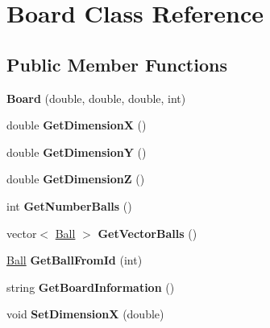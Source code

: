 \hypertarget{classBoard}{\section{Board Class Reference}
\label{classBoard}
}
\subsection*{Public Member Functions}
\begin{DoxyCompactItemize}
\item 
\hypertarget{classBoard_af26e9eedabd3559a0a823594a9836a9c}{{\bfseries Board} (double, double, double, int)}\label{classBoard_af26e9eedabd3559a0a823594a9836a9c}

\item 
\hypertarget{classBoard_a6004dec19aa29da6fffee5ceec0a13ae}{double {\bfseries Get\+Dimension\+X} ()}\label{classBoard_a6004dec19aa29da6fffee5ceec0a13ae}

\item 
\hypertarget{classBoard_a5d90ba60a138223ce0dc9679d50fbdb8}{double {\bfseries Get\+Dimension\+Y} ()}\label{classBoard_a5d90ba60a138223ce0dc9679d50fbdb8}

\item 
\hypertarget{classBoard_aff29d5fed09c4f613fd8f910e77125ff}{double {\bfseries Get\+Dimension\+Z} ()}\label{classBoard_aff29d5fed09c4f613fd8f910e77125ff}

\item 
\hypertarget{classBoard_a626fb9f489b8bdf89d08c6b49b3e7555}{int {\bfseries Get\+Number\+Balls} ()}\label{classBoard_a626fb9f489b8bdf89d08c6b49b3e7555}

\item 
\hypertarget{classBoard_a3b6346e52d69e15ddba100248cfe4789}{vector$<$ \hyperlink{classBall}{Ball} $>$ {\bfseries Get\+Vector\+Balls} ()}\label{classBoard_a3b6346e52d69e15ddba100248cfe4789}

\item 
\hypertarget{classBoard_ad7661f151aa307b5cf3c4a7aa809ced4}{\hyperlink{classBall}{Ball} {\bfseries Get\+Ball\+From\+Id} (int)}\label{classBoard_ad7661f151aa307b5cf3c4a7aa809ced4}

\item 
\hypertarget{classBoard_a4963e139df9b877cdd57770e01d26d7a}{string {\bfseries Get\+Board\+Information} ()}\label{classBoard_a4963e139df9b877cdd57770e01d26d7a}

\item 
\hypertarget{classBoard_a770d11a85df68916f931e457028be6eb}{void {\bfseries Set\+Dimension\+X} (double)}\label{classBoard_a770d11a85df68916f931e457028be6eb}


\end{DoxyCompactItemize}
